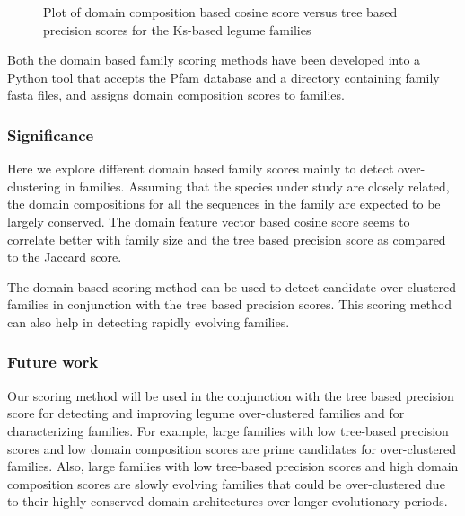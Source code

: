 \documentclass{article}
\begin{document}
		\begin{figure}
			\caption{Plot of domain composition based cosine score versus tree based precision scores for the Ks-based legume families}
			\label{fig:scatter_domain_cosine_vs_tree_precision_lgf5}
		\end{figure}
		
		Both the domain based family scoring methods have been developed into a Python tool that accepts the Pfam database and a directory containing family fasta files, and assigns domain composition scores to families.
	
	\subsubsection{Significance}
	Here we explore different domain based family scores mainly to detect over-clustering in families. Assuming that the species under study are closely related, the domain compositions for all the sequences in the family are expected to be largely conserved. The domain feature vector based cosine score seems to correlate better with family size and the tree based precision score as compared to the Jaccard score.
	
	The domain based scoring method can be used to detect candidate over-clustered families in conjunction with the tree based precision scores. This scoring method can also help in detecting rapidly evolving families.
	
	\subsubsection{Future work}
	Our scoring method will be used in the conjunction with the tree based precision score for detecting and improving  legume over-clustered families and for characterizing families. For example,  large families with low tree-based precision scores and low domain composition scores are prime candidates for over-clustered families. Also, large families with low tree-based precision scores and high domain composition scores are slowly evolving families that could be over-clustered due to their highly conserved domain architectures over longer evolutionary periods.
	
\end{document}
